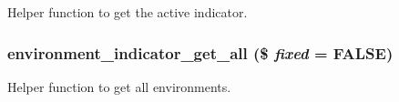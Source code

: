 \label{environment__indicator_8module_aa06d8e1c77d18fa0f4d06be742140263}
Helper function to get the active indicator. \hypertarget{environment__indicator_8module_acd0e8c886d4a9dfeb7a51e5ca2b21128}{
\subsubsection[{environment\_\-indicator\_\-get\_\-all}]{\setlength{\rightskip}{0pt plus 5cm}environment\_\-indicator\_\-get\_\-all (\$ {\em fixed} = {\ttfamily FALSE})}}
\label{environment__indicator_8module_acd0e8c886d4a9dfeb7a51e5ca2b21128}
Helper function to get all environments.


